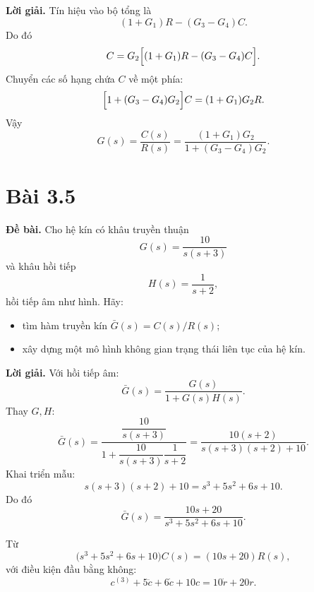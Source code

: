 \documentclass[11pt,a4paper]{article}
\newcommand{\baitap}[1]{%
  \Needspace{4\baselineskip}%
  \section*{Bài #1}%
}
\newcommand{\debai}{\par\noindent\textbf{Đề bài.}\enspace}
\newcommand{\loigiai}{\par\smallskip\noindent\textbf{Lời giải.}\enspace}
\begin{document}
\loigiai
Tín hiệu vào bộ tổng là
\[
(1+G_1)R-(G_3-G_4)C.
\]
Do đó
\[
C
=
G_2\Bigl[(1+G_1)R-(G_3-G_4)C\Bigr].
\]
Chuyển các số hạng chứa \(C\) về một phía:
\[
\Bigl[1+(G_3-G_4)G_2\Bigr]C
=(1+G_1)G_2R.
\]
Vậy
\[
\boxed{
G(s)=\frac{C(s)}{R(s)}
=
\frac{(1+G_1)G_2}
{1+(G_3-G_4)G_2}.}
\]

\baitap{3.5}
\debai
Cho hệ kín có khâu truyền thuận
\[
G(s)=\frac{10}{s(s+3)}
\]
và khâu hồi tiếp
\[
H(s)=\frac{1}{s+2},
\]
hồi tiếp âm như hình. Hãy:
\begin{itemize}
  \item tìm hàm truyền kín \(\bar G(s)=C(s)/R(s)\);
  \item xây dựng một mô hình không gian trạng thái liên tục của hệ kín.
\end{itemize}

\begin{center}
\end{center}

\loigiai
Với hồi tiếp âm:
\[
\bar G(s)
=
\frac{G(s)}{1+G(s)H(s)}.
\]
Thay \(G,H\):
\[
\bar G(s)
=
\frac{\dfrac{10}{s(s+3)}}
{1+\dfrac{10}{s(s+3)}\dfrac{1}{s+2}}
=
\frac{10(s+2)}
{s(s+3)(s+2)+10}.
\]
Khai triển mẫu:
\[
s(s+3)(s+2)+10
=s^3+5s^2+6s+10.
\]
Do đó
\[
\boxed{
\bar G(s)
=
\frac{10s+20}
{s^3+5s^2+6s+10}.}
\]

Từ
\[
\bigl(s^3+5s^2+6s+10\bigr)C(s)
=
(10s+20)R(s),
\]
với điều kiện đầu bằng không:
\[
c^{(3)}+5\ddot c+6\dot c+10c
=
10\dot r+20r. \tag{1}
\]
\end{document}
